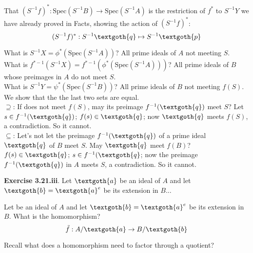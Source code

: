 \documentclass{article}
\begin{document}

\noindent
That $(S^{-1}f)^* : \textrm{Spec}(S^{-1}B) \rightarrow \textrm{Spec}(S^{-1}A)$ is the restriction of $f^*$ to $S^{-1}Y$ we have already proved in Facts, showing the action of $(S^{-1}f)^*$:
\[
    (S^{-1}f)^*: S^{-1}\textgoth{q} \mapsto S^{-1}\textgoth{p}
\]

\noindent
What is $S^{-1}X = \phi^*(\textrm{Spec}(S^{-1}A))$? All prime ideals of $A$ not meeting $S$. \\ 
What is $f^{*-1}(S^{-1}X) = f^{*-1}(\phi^*(\textrm{Spec}(S^{-1}A)))$? All prime ideals of $B$ whose preimages in $A$ do not meet $S$. \\
What is $S^{-1}Y = \psi^*(\textrm{Spec}(S^{-1}B))$? All prime ideals of $B$ not meeting $f(S)$. \\ 
We show that the the last two sets are equal.\\
$\supseteq$: If  does not meet $f(S)$, may its preimage $f^{-1}(\textgoth{q})$ meet $S$? Let $s \in f^{-1}(\textgoth{q})$; $f(s) \in \textgoth{q}$; now $\textgoth{q}$ meets $f(S)$, a contradiction. So it cannot. \\
$\subseteq$: Let's not let the preimage $f^{-1}(\textgoth{q})$ of a prime ideal $\textgoth{q}$ of
$B$ meet $S$. May $\textgoth{q}$ meet $f(B)$? $f(s) \in \textgoth{q}$; $s\in f^{-1}(\textgoth{q}$; now the preimage $f^{-1}(\textgoth{q})$ in $A$ meets $S$, a contradiction. So it cannot. 


\vspace*{22px}

\textbf{Exercise 3.21.iii}. 
Let $\textgoth{a}$ be an ideal of $A$ and let $\textgoth{b} = \textgoth{a}^e$ be its extension in $B$...

\vspace*{10px} 

Let  be an ideal of $A$ and let $\textgoth{b} = \textgoth{a}^e$ be its extension in $B$. What is the homomorphism?
\[
  \tilde{f}: A/\textgoth{a} \rightarrow B/\textgoth{b} 
\]

\noindent
Recall what does a homomorphism need to factor through a quotient?
\end{document}
